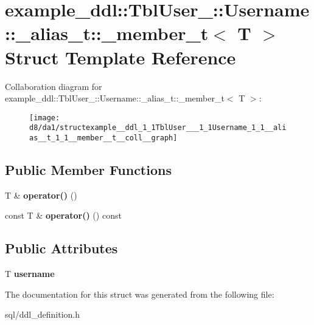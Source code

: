 \hypertarget{structexample__ddl_1_1TblUser___1_1Username_1_1__alias__t_1_1__member__t}{}\section{example\+\_\+ddl\+:\+:Tbl\+User\+\_\+\+:\+:Username\+:\+:\+\_\+alias\+\_\+t\+:\+:\+\_\+member\+\_\+t$<$ T $>$ Struct Template Reference}
\label{structexample__ddl_1_1TblUser___1_1Username_1_1__alias__t_1_1__member__t}


Collaboration diagram for example\+\_\+ddl\+:\+:Tbl\+User\+\_\+\+:\+:Username\+:\+:\+\_\+alias\+\_\+t\+:\+:\+\_\+member\+\_\+t$<$ T $>$\+:
\nopagebreak
\begin{figure}[H]
\begin{center}
\leavevmode
\texttt{[image: d8/da1/structexample\_\_ddl\_1\_1TblUser\_\_\_1\_1Username\_1\_1\_\_alias\_\_t\_1\_1\_\_member\_\_t\_\_coll\_\_graph]}
\end{center}
\end{figure}
\subsection*{Public Member Functions}
\begin{DoxyCompactItemize}
\item 
\hypertarget{structexample__ddl_1_1TblUser___1_1Username_1_1__alias__t_1_1__member__t_aceb8d12f9e95e95c3b7cee50183d3672}{}T \& {\bfseries operator()} ()\label{structexample__ddl_1_1TblUser___1_1Username_1_1__alias__t_1_1__member__t_aceb8d12f9e95e95c3b7cee50183d3672}

\item 
\hypertarget{structexample__ddl_1_1TblUser___1_1Username_1_1__alias__t_1_1__member__t_a43572ee6342b7b81d7ba7337af3d33cd}{}const T \& {\bfseries operator()} () const \label{structexample__ddl_1_1TblUser___1_1Username_1_1__alias__t_1_1__member__t_a43572ee6342b7b81d7ba7337af3d33cd}

\end{DoxyCompactItemize}
\subsection*{Public Attributes}
\begin{DoxyCompactItemize}
\item 
\hypertarget{structexample__ddl_1_1TblUser___1_1Username_1_1__alias__t_1_1__member__t_a5a26e16c5ebb7bf567be2ba2383ee9d2}{}T {\bfseries username}\label{structexample__ddl_1_1TblUser___1_1Username_1_1__alias__t_1_1__member__t_a5a26e16c5ebb7bf567be2ba2383ee9d2}

\end{DoxyCompactItemize}


The documentation for this struct was generated from the following file\+:\begin{DoxyCompactItemize}
\item 
sql/ddl\+\_\+definition.\+h\end{DoxyCompactItemize}
